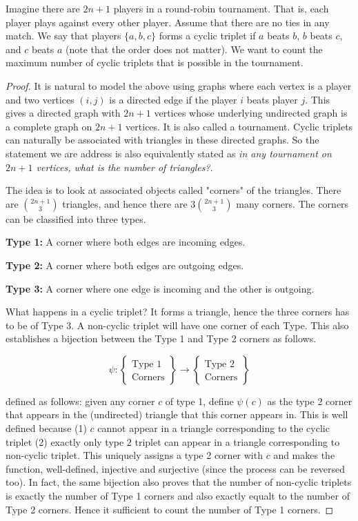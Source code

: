 \begin{problem}
Imagine there are $2n+1$ players in a round-robin tournament. That is, each player plays against every other player. Assume that there are no ties in any match. We say that players $\{a,b,c\}$ forms a cyclic triplet if $a$ beats $b$, $b$ beats $c$, and $c$ beats $a$ (note that the order does not matter). We want to count the maximum number of cyclic triplets that is possible in the tournament.
\end{problem}
\begin{proof}
It is natural to model the above using graphs where each vertex is a player and two vertices $(i,j)$ is a directed edge if the player $i$ beats player $j$. This gives a directed graph with $2n+1$ vertices whose underlying undirected graph is a complete graph on $2n+1$ vertices. It is also called a tournament. Cyclic triplets can naturally be associated with triangles in these directed graphs. So the statement we are address is also equivalently stated as {\em in any tournament on $2n+1$ vertices, what is the number of triangles?}.

The idea is to look at associated objects called "corners" of the triangles. There are ${2n+1 \choose 3}$ triangles, and hence there are $3 {2n+1 \choose 3}$ many corners. The corners can be classified into three types.
\begin{description}
\item{\bf Type 1:} A corner where both edges are incoming edges.
\item{\bf Type 2:} A corner where both edges are outgoing edges.
\item{\bf Type 3:} A corner where one edge is incoming and the other is outgoing.
\end{description}

What happens in a cyclic triplet? It forms a triangle, hence the three corners has to be of Type 3. A non-cyclic triplet will have one corner of each Type. This also establishes a bijection between the Type 1 and Type 2 corners as follows.

$$ \psi : \left\{ \begin{array}{c} \textrm{Type 1} \\ \textrm{Corners}  \end{array} \right\} \to \left\{ \begin{array}{c} \textrm{Type 2} \\ \textrm{Corners}  \end{array} \right\} $$

defined as follows: given any corner $c$ of type 1, define $\psi(c)$ as the type 2 corner that appears in the (undirected) triangle that this corner appears in. This is well defined because (1) $c$ cannot appear in a triangle corresponding to the cyclic triplet (2) exactly only type $2$ triplet can appear in a triangle corresponding to non-cyclic triplet. This uniquely assigns a type 2 corner with $c$ and makes the function, well-defined, injective and surjective (since the process can be reversed too). In fact, the same bijection also proves that the number of non-cyclic triplets is exactly the number of Type 1 corners and also exactly equalt to the number of Type 2 corners. Hence it sufficient to count the number of Type 1 corners. 


\end{proof}
